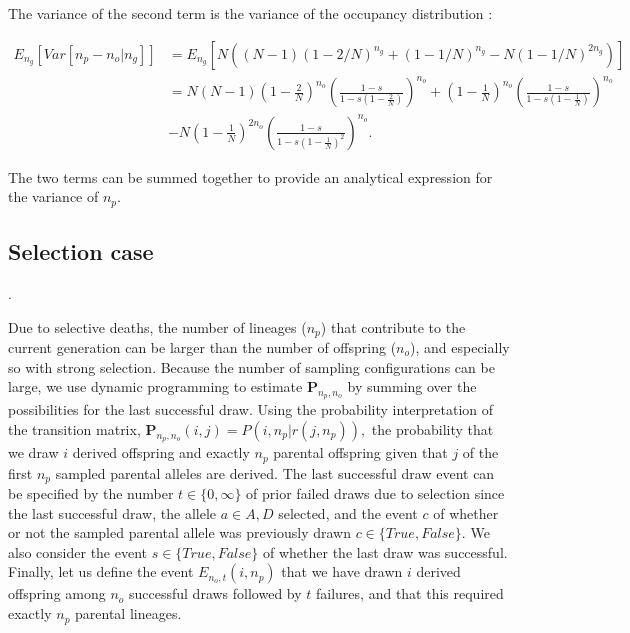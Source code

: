 \documentclass[review]{elsarticle}
\newcommand{\ikcomment}[1]{{\color{blue}{IK: #1}}}
\begin{document}
The variance of the second term is the variance of the occupancy distribution \cite{}:

\begin{equation}
\begin{split}
E_{n_g}\left[Var\left[n_p-n_o | n_g \right]\right] & = E_{n_g}\left[N ((N - 1) (1 - 2/N)^{n_g} + (1 - 1/N)^{n_g} - N (1 - 1/N)^{2 n_g}) \right] \\
& = N (N-1)  \left(1-\frac{2}{N}\right)^{n_o} \left(\frac{1-s}{1-s  \left(1-\frac{2}{N}\right)}\right)^{n_o} +  \left(1-\frac{1}{N}\right)^{n_o} \left(\frac{1-s}{1-s  \left(1-\frac{1}{N}\right)}\right)^{n_o} \\
&-N  \left(1-\frac{1}{N}\right)^{2n_o} \left(\frac{1-s}{1-s  \left(1-\frac{1}{N}\right)^2}\right)^{n_o}. 
\end{split}
\end{equation}

The two terms can be summed together to provide an analytical expression for the variance of $n_p$. 


\subsection{Selection case}
\label{subsec:apx:tpm}

\ikcomment{I've changed the event $r$ to $c$ in the main text (to avoid the unlikely confusing for
  $r$, the number of failures). This will need to be propagated in here, too}.

Due to selective deaths, the number of lineages ($n_p$) that contribute to the current generation
can be larger than the number of offspring ($n_o$), and especially so with strong selection. Because
the number of sampling configurations can be large, we use dynamic programming to estimate
$\mathbf{P}_{n_p,n_o}$ by summing over the possibilities for the last successful draw. Using the
probability interpretation of the transition matrix,
$\mathbf{P}_{n_p,n_o}(i,j) = P(i, n_p | r(j, n_p)),$ the probability that we draw $i$ derived
offspring and exactly $n_p$ parental offspring given that $j$ of the first $n_p$ sampled parental
alleles are derived. The last successful draw event can be specified by the number
$t \in \{0,\infty\}$ of prior failed draws due to selection since the last successful draw, the
allele $a \in {A, D}$ selected, and the event $c$ of whether or not the sampled parental allele was
previously drawn $c\in \{True, False\}$. We also consider the event $s \in \{True, False\}$ of
whether the last draw was successful. Finally, let us define the event $E_{n_o,t}(i,n_p)$ that we
have drawn $i$ derived offspring among $n_o$ successful draws followed by $t$ failures, and that
this required exactly $n_p$ parental lineages.
\end{document}
